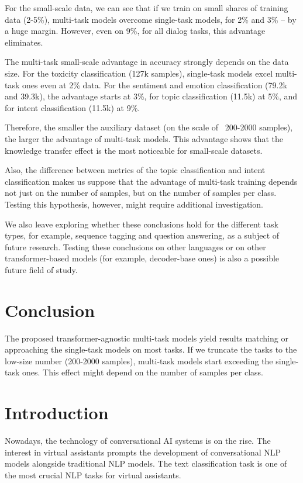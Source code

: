 For the small-scale data, we can see that if we train on small shares of training data (2-5\%), multi-task models overcome single-task models, for 2\% and 3\% -- by a huge margin. However, even on 9\%, for all dialog tasks, this advantage eliminates.

The multi-task small-scale advantage in accuracy strongly depends on the data size. For the toxicity classification (127k samples), single-task models excel multi-task ones even at 2\% data. For the sentiment and emotion classification (79.2k and 39.3k), the advantage starts at 3\%, for topic classification (11.5k) at 5\%, and for intent classification (11.5k) at 9\%. 

Therefore, the smaller the auxiliary dataset (on the scale of ~200-2000 samples), the larger the advantage of multi-task models. This advantage shows that the knowledge transfer effect is the most noticeable for small-scale datasets.

Also, the difference between metrics of the topic classification and intent classification makes us suppose that the advantage of multi-task training depends not just on the number of samples, but on the number of samples per class. Testing this hypothesis, however, might require additional investigation. 

We also leave exploring whether these conclusions hold for the different task types, for example, sequence tagging and question answering, as a subject of future research. Testing these 
conclusions on other languages or on other transformer-based models (for example, decoder-base ones)  is also a possible future field of study.

\section{Conclusion}

The proposed transformer-agnostic multi-task models yield results matching or approaching the single-task models on most tasks. If we truncate the tasks to the low-size number (200-2000 samples), multi-task models start exceeding the single-task ones. This effect might depend on the number of samples per class.
\fi
\iffalse
\section{Introduction}
Nowadays, the technology of conversational AI systems is on the rise. The interest in virtual assistants prompts the development of conversational NLP models alongside traditional NLP models. The text classification task is one of the most crucial NLP tasks for virtual assistants.

